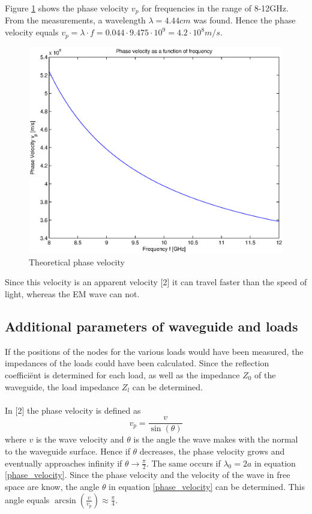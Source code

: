 \documentclass[11pt,a4paper]{article}
\begin{document}
Figure \ref{v_phase} shows the phase velocity $v_p$ for frequencies in the range of 8-12GHz. From the measurements, a wavelength $\lambda=4.44cm$ was found. Hence the phase velocity equals $v_p=\lambda \cdot f=0.044\cdot9.475\cdot 10^9=4.2\cdot10^8 m/s$.\\

\begin{figure}[H]
\begin{center}
\includegraphics[scale=0.7]{phase_velocity.eps}
\caption{Theoretical phase velocity}
\label{v_phase}
\end{center}
\end{figure}

Since this velocity is an apparent velocity [2] it can travel faster than the speed of light, whereas the EM wave can not. 

\subsection{Additional parameters of waveguide and loads}
If the positions of the nodes for the various loads would have been measured, the impedances of the loads could have been calculated. Since the reflection coeffici\"ent is determined for each load, as well as the impedance $Z_0$ of the waveguide, the load impedance $Z_l$ can be determined.\\
\\
In [2] the phase velocity is defined as
\begin{equation}
v_p=\frac{v}{\sin(\theta)}
\end{equation}
where $v$ is the wave velocity and $\theta$ is the angle the wave makes with the normal to the waveguide surface. Hence if $\theta$ decreases, the phase velocity grows and eventually approaches infinity if $\theta \rightarrow \frac{\pi}{2}$. The same occurs if $\lambda_0=2a$ in equation \ref{phase_velocity}.
Since the phase velocity and the velocity of the wave in free space are know, the angle $\theta$ in equation \ref{phase_velocity} can be determined. This angle equals $\arcsin(\frac{v}{v_p})\approx\frac{\pi}{4}$.
\end{document}
